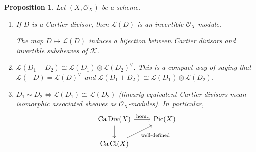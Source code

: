 \documentclass[12pt]{article}
\DeclareMathOperator{\Pic}{Pic}
\DeclareMathOperator{\Div}{Div}
\DeclareMathOperator{\Cl}{Cl}
\DeclareMathOperator{\Ca}{Ca}
\newtheorem*{proposition}{Proposition}
\theoremstyle{definition}
\begin{document}
\begin{proposition}
Let $(X,\mathcal{O}_X)$ be a scheme.

\begin{enumerate}[label=\roman*)]
\item If $D$ is a Cartier divisor, then $\mathcal{L}(D)$ is an invertible $\mathcal{O}_X$-module.

The map $D\mapsto\mathcal{L}(D)$ induces a bijection between Cartier divisors and invertible subsheaves of $\mathcal{K}$.

\item\label{menos_dual} $\mathcal{L}(D_1-D_2)\cong\mathcal{L}(D_1)\otimes\mathcal{L}(D_2)^{\vee}$. This is a compact way of saying that $\mathcal{L}(-D)=\mathcal{L}(D)^{\vee}$ and $\mathcal{L}(D_1+D_2)\cong\mathcal{L}(D_1)\otimes\mathcal{L}(D_2)$.

\item $D_1\sim D_2\Leftrightarrow\mathcal{L}(D_1)\cong\mathcal{L}(D_2)$ (linearly equivalent Cartier divisors mean isomorphic associated sheaves as $\mathcal{O}_X$-modules). In particular,
\[
\begin{tikzcd}
\Ca\Div(X)\arrow[r,"\text{hom.}"]\arrow[d]&\Pic(X)\\
\Ca\Cl(X)\arrow[ru,"\text{well-defined}",swap]
\end{tikzcd}
\]
\end{enumerate}
\end{proposition}
\end{document}
